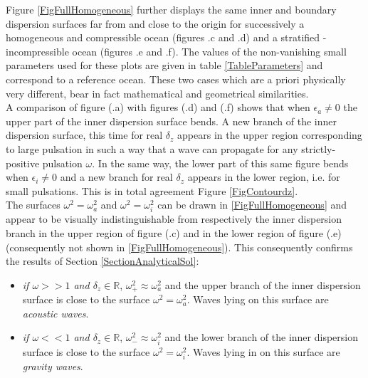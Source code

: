 \documentclass[a4paper,11pt]{article}
\begin{document}
Figure \ref{FigFullHomogeneous} further displays the same inner and boundary dispersion surfaces far from and close to the origin for successively a homogeneous and compressible ocean (figures .c and .d) and  a stratified - incompressible ocean (figures .e and .f). The values of the non-vanishing small parameters used for these plots are given in table \ref{TableParameters} and correspond to a reference ocean. These two cases which are a priori physically very different, bear in fact mathematical and geometrical similarities.\\
A comparison of figure (.a) with figures (.d) and (.f) shows that when $\epsilon_a \neq 0$ the upper part of the inner dispersion surface bends. A new branch of the inner dispersion surface, this time for real $\delta_z$ appears in the upper region corresponding to large pulsation in such a way that a wave can propagate for any strictly-positive pulsation $\omega$. In the same way, the lower part of this same figure bends when $\epsilon_i \neq 0$ and a new branch for real $\delta_z$ appears in the lower region, i.e. for small pulsations. This is in total agreement Figure \ref{FigContourdz}.\\
The surfaces $\omega^2=\omega_a^2$ and $\omega^2=\omega_i^2$ can be drawn in \ref{FigFullHomogeneous} and appear to be visually indistinguishable from respectively the inner dispersion branch in the upper region of figure (.c) and in the lower region of figure (.e) (consequently not shown in \ref{FigFullHomogeneous}). This consequently confirms the results of Section \ref{SectionAnalyticalSol}:
\begin{itemize}
	\item \textit{if $\omega>>1$ and $\delta_z\in\mathbb{R}$}, $\omega_+^2\approx\omega_a^2$ and the upper branch of the inner dispersion surface is close to the surface $\omega^2=\omega_a^2$. Waves lying on this surface are \textit{acoustic waves}.
	\item \textit{if $\omega<<1$ and $\delta_z\in\mathbb{R}$}, $\omega_-^2\approx\omega_i^2$ and the lower branch of the inner dispersion surface is close to the surface $\omega^2=\omega_i^2$. Waves lying in on this surface are \textit{gravity waves}.
\end{itemize}
\end{document}
